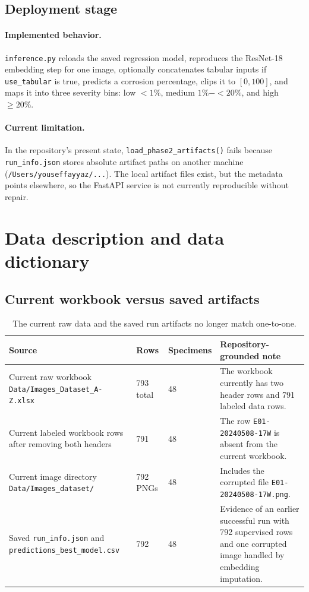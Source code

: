 \documentclass[11pt]{article}
\begin{document}
\subsection{Deployment stage}
\paragraph{Implemented behavior.}
\texttt{inference.py} reloads the saved regression model, reproduces the ResNet-18 embedding step for one image, optionally concatenates tabular inputs if \texttt{use\_tabular} is true, predicts a corrosion percentage, clips it to \([0,100]\), and maps it into three severity bins: low \(<1\%\), medium \(1\%-<20\%\), and high \(\geq 20\%\).

\paragraph{Current limitation.}
In the repository's present state, \texttt{load\_phase2\_artifacts()} fails because \texttt{run\_info.json} stores absolute artifact paths on another machine (\texttt{/Users/youseffayyaz/...}). The local artifact files exist, but the metadata points elsewhere, so the FastAPI service is not currently reproducible without repair.

\section{Data description and data dictionary}

\subsection{Current workbook versus saved artifacts}

\begin{table}[H]
\centering
\small
\begin{tabularx}{\textwidth}{p{} p{} p{} Y}
\toprule
\textbf{Source} & \textbf{Rows} & \textbf{Specimens} & \textbf{Repository-grounded note} \\
\midrule
Current raw workbook \texttt{Data/Images\_Dataset\_A-Z.xlsx} & 793 total & 48 & The workbook currently has two header rows and 791 labeled data rows. \\
Current labeled workbook rows after removing both headers & 791 & 48 & The row \texttt{E01-20240508-17W} is absent from the current workbook. \\
Current image directory \texttt{Data/Images\_dataset/} & 792 PNGs & 48 & Includes the corrupted file \texttt{E01-20240508-17W.png}. \\
Saved \texttt{run\_info.json} and \texttt{predictions\_best\_model.csv} & 792 & 48 & Evidence of an earlier successful run with 792 supervised rows and one corrupted image handled by embedding imputation. \\
\bottomrule
\end{tabularx}
\caption{The current raw data and the saved run artifacts no longer match one-to-one.}
\label{tab:raw_vs_artifact}
\end{table}
\end{document}
